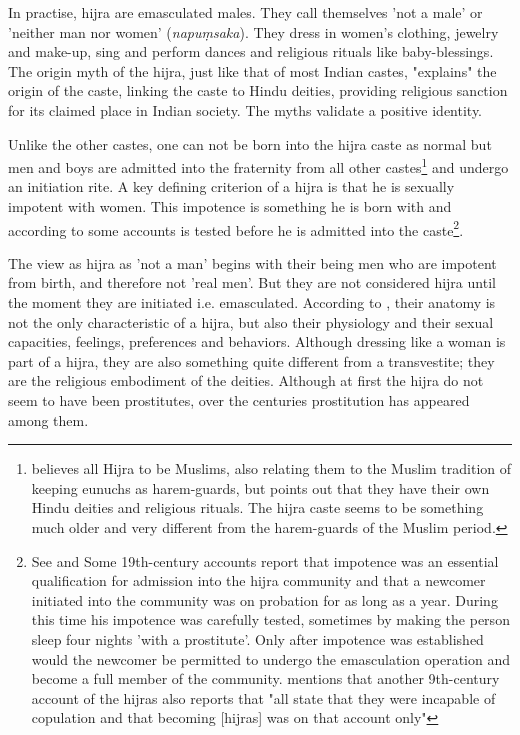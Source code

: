 In practise, hijra are emasculated males. They call themselves 'not a male' or 'neither man nor women' ({\em napuṃsaka}). They dress in women's clothing, jewelry and make-up, sing and perform dances and religious rituals like baby-blessings. The origin myth of the hijra, just like that of most Indian castes, "explains" the origin of the caste, linking the caste to Hindu deities, providing religious sanction for its claimed place in Indian society. The myths validate a positive identity.

Unlike the other castes, one can not be born into the hijra caste as normal but men and boys are admitted into the fraternity from all other castes\footnote{\cite{ibbetson} believes all Hijra to be Muslims, also relating them to the Muslim tradition of keeping eunuchs as harem-guards, but \cite{nanda} points out that they have their own Hindu deities and religious rituals. The hijra caste seems to be something much older and very different from the harem-guards of the Muslim period.} and undergo an initiation rite. A key defining criterion of a hijra is that he is sexually impotent with women. This impotence is something he is born with and according to some accounts is tested before he is admitted into the caste\footnote{See \cite{shah} and \cite{bhimbhai} Some 19th-century accounts report that impotence was an essential qualification for admission into the hijra community and that a newcomer initiated into the community was on probation for as long as a year. During this time his impotence was carefully tested, sometimes by making the person sleep four nights 'with a prostitute'. Only after impotence was established would the newcomer be permitted to undergo the emasculation operation and become a full member of the community. \cite{preston} mentions that another 9th-century account of the hijras also reports that "all state that they were incapable of copulation and that becoming [hijras] was on that account only"}.

The view as hijra as 'not a man' begins with their being men who are impotent from birth, and therefore not 'real men'. But they are not considered hijra until the moment they are initiated i.e. emasculated. According to \cite{nanda}, their anatomy is not the only characteristic of a hijra, but also their physiology and their sexual capacities, feelings, preferences and behaviors. Although dressing like a woman is part of a hijra, they are also something quite different from a transvestite; they are the religious embodiment of the deities. Although at first the hijra do not seem to have been prostitutes, over the centuries prostitution has appeared among them.

